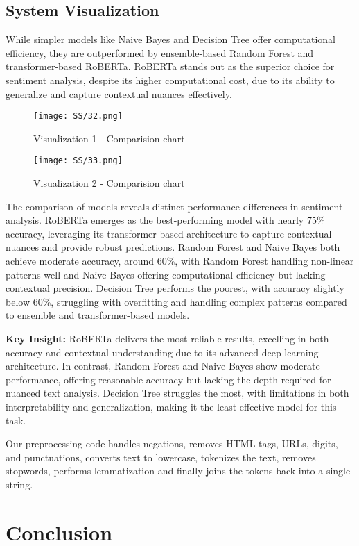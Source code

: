 \documentclass[journal]{IEEEtran}
\begin{document}
\subsection{ System Visualization}
While simpler models like Naive Bayes and Decision Tree offer computational efficiency, they are outperformed by ensemble-based Random Forest and transformer-based RoBERTa. RoBERTa stands out as the superior choice for sentiment analysis, despite its higher computational cost, due to its ability to generalize and capture contextual nuances effectively.
\begin{figure}[H]
\centering
\texttt{[image: SS/32.png]}
\caption{Visualization 1 - Comparision chart}
\end{figure}
\begin{figure}[H]
\centering
\texttt{[image: SS/33.png]}
\caption{Visualization 2 - Comparision chart}
\end{figure}
The comparison of models reveals distinct performance differences in sentiment analysis. RoBERTa emerges as the best-performing model with nearly 75\% accuracy, leveraging its transformer-based architecture to capture contextual nuances and provide robust predictions. Random Forest and Naive Bayes both achieve moderate accuracy, around 60\%, with Random Forest handling non-linear patterns well and Naive Bayes offering computational efficiency but lacking contextual precision. Decision Tree performs the poorest, with accuracy slightly below 60\%, struggling with overfitting and handling complex patterns compared to ensemble and transformer-based models.

\textbf{Key Insight:} RoBERTa delivers the most reliable results, excelling in both accuracy and contextual understanding due to its advanced deep learning architecture. In contrast, Random Forest and Naive Bayes show moderate performance, offering reasonable accuracy but lacking the depth required for nuanced text analysis. Decision Tree struggles the most, with limitations in both interpretability and generalization, making it the least effective model for this task.

Our preprocessing code handles negations, removes HTML tags, URLs, digits, and punctuations, converts text to lowercase, tokenizes the text, removes stopwords, performs lemmatization and finally joins the tokens back into a single string.

\section{\textbf{Conclusion}}
\end{document}

